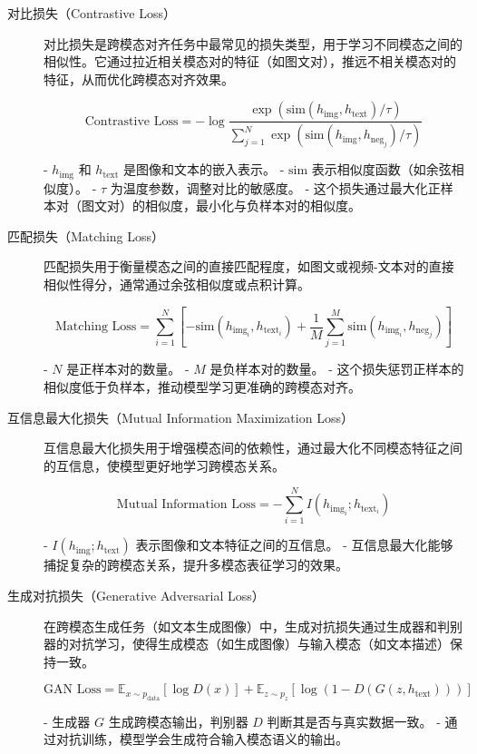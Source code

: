 \documentclass[12pt]{article}
\begin{document}
\begin{description}
    \item[对比损失（Contrastive Loss）] 

    对比损失是跨模态对齐任务中最常见的损失类型，用于学习不同模态之间的相似性。它通过拉近相关模态对的特征（如图文对），推远不相关模态对的特征，从而优化跨模态对齐效果。
    
    \[
    \text{Contrastive Loss} = -\log \frac{\exp(\text{sim}(h_{\text{img}}, h_{\text{text}}) / \tau)}{\sum_{j=1}^{N} \exp(\text{sim}(h_{\text{img}}, h_{\text{neg}_j}) / \tau)}
    \]
    
    - \( h_{\text{img}} \) 和 \( h_{\text{text}} \) 是图像和文本的嵌入表示。
    - \( \text{sim} \) 表示相似度函数（如余弦相似度）。
    - \( \tau \) 为温度参数，调整对比的敏感度。
    - 这个损失通过最大化正样本对（图文对）的相似度，最小化与负样本对的相似度。
    \item[匹配损失（Matching Loss）]

    匹配损失用于衡量模态之间的直接匹配程度，如图文或视频-文本对的直接相似性得分，通常通过余弦相似度或点积计算。
    
    \[
    \text{Matching Loss} = \sum_{i=1}^{N} \left[ -\text{sim}(h_{\text{img}_i}, h_{\text{text}_i}) + \frac{1}{M} \sum_{j=1}^{M} \text{sim}(h_{\text{img}_i}, h_{\text{neg}_j}) \right]
    \]
    
    - \( N \) 是正样本对的数量。
    - \( M \) 是负样本对的数量。
    - 这个损失惩罚正样本的相似度低于负样本，推动模型学习更准确的跨模态对齐。
    \item[互信息最大化损失（Mutual Information Maximization Loss）]
    \item[] 
    互信息最大化损失用于增强模态间的依赖性，通过最大化不同模态特征之间的互信息，使模型更好地学习跨模态关系。
    
    \[
    \text{Mutual Information Loss} = -\sum_{i=1}^{N} I(h_{\text{img}_i}; h_{\text{text}_i})
    \]
    
    - \( I(h_{\text{img}}; h_{\text{text}}) \) 表示图像和文本特征之间的互信息。
    - 互信息最大化能够捕捉复杂的跨模态关系，提升多模态表征学习的效果。
    \item[生成对抗损失（Generative Adversarial Loss）]

    在跨模态生成任务（如文本生成图像）中，生成对抗损失通过生成器和判别器的对抗学习，使得生成模态（如生成图像）与输入模态（如文本描述）保持一致。
    
    \[
    \text{GAN Loss} = \mathbb{E}_{x \sim p_{\text{data}}}[\log D(x)] + \mathbb{E}_{z \sim p_z}[\log (1 - D(G(z, h_{\text{text}})))]
    \]
    
    - 生成器 \( G \) 生成跨模态输出，判别器 \( D \) 判断其是否与真实数据一致。
    - 通过对抗训练，模型学会生成符合输入模态语义的输出。
    
\end{description}
\end{document}
